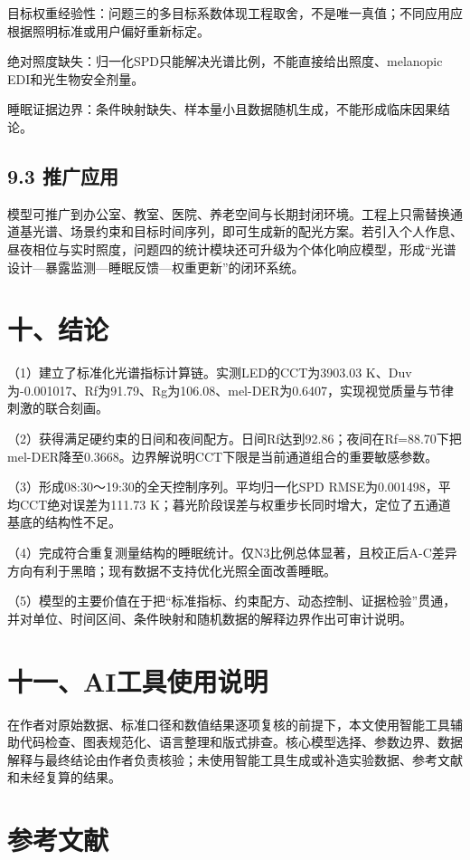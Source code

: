 \documentclass[UTF8,a4paper,12pt]{ctexart}
\begin{document}
目标权重经验性：问题三的多目标系数体现工程取舍，不是唯一真值；不同应用应根据照明标准或用户偏好重新标定。

绝对照度缺失：归一化SPD只能解决光谱比例，不能直接给出照度、melanopic EDI和光生物安全剂量。

睡眠证据边界：条件映射缺失、样本量小且数据随机生成，不能形成临床因果结论。

\subsection{9.3 推广应用}

模型可推广到办公室、教室、医院、养老空间与长期封闭环境。工程上只需替换通道基光谱、场景约束和目标时间序列，即可生成新的配光方案。若引入个人作息、昼夜相位与实时照度，问题四的统计模块还可升级为个体化响应模型，形成“光谱设计—暴露监测—睡眠反馈—权重更新”的闭环系统。

\section{十、结论}

（1）建立了标准化光谱指标计算链。实测LED的CCT为3903.03 K、Duv为-0.001017、Rf为91.79、Rg为106.08、mel-DER为0.6407，实现视觉质量与节律刺激的联合刻画。

（2）获得满足硬约束的日间和夜间配方。日间Rf达到92.86；夜间在Rf=88.70下把mel-DER降至0.3668。边界解说明CCT下限是当前通道组合的重要敏感参数。

（3）形成08:30～19:30的全天控制序列。平均归一化SPD RMSE为0.001498，平均CCT绝对误差为111.73 K；暮光阶段误差与权重步长同时增大，定位了五通道基底的结构性不足。

（4）完成符合重复测量结构的睡眠统计。仅N3比例总体显著，且校正后A-C差异方向有利于黑暗；现有数据不支持优化光照全面改善睡眠。

（5）模型的主要价值在于把“标准指标、约束配方、动态控制、证据检验”贯通，并对单位、时间区间、条件映射和随机数据的解释边界作出可审计说明。

\section{十一、AI工具使用说明}

在作者对原始数据、标准口径和数值结果逐项复核的前提下，本文使用智能工具辅助代码检查、图表规范化、语言整理和版式排查。核心模型选择、参数边界、数据解释与最终结论由作者负责核验；未使用智能工具生成或补造实验数据、参考文献和未经复算的结果。

\section{参考文献}
\end{document}
